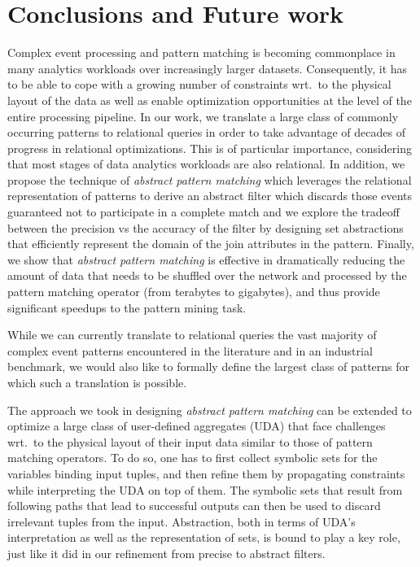 \section{Conclusions and Future work}
\label{sec:conclusions}

Complex event processing and pattern matching is becoming commonplace in many 
analytics workloads over increasingly larger datasets.
Consequently, it has to be able to cope with a growing number of constraints 
wrt.\ to the physical layout of the data as well as enable optimization 
opportunities at the level of the entire processing pipeline.
In our work, we translate a large class of commonly occurring patterns to 
relational queries in order to take advantage of decades of progress in 
relational optimizations.
This is of particular importance, considering that most stages of data 
analytics workloads are also relational. 
In addition, we propose the technique of {\em abstract pattern matching} which 
leverages the relational representation of patterns to derive an abstract 
filter which discards those events guaranteed not to participate in a complete 
match and we explore the tradeoff between the precision vs the accuracy of the 
filter by designing set abstractions that efficiently represent the domain of 
the join attributes in the pattern.
Finally, we show that {\em abstract pattern matching} is effective in 
dramatically reducing the amount of data that needs to be shuffled over the 
network and processed by the pattern matching operator (from terabytes to 
gigabytes), and thus provide significant speedups to the pattern mining task. 

While we can currently translate to relational queries the vast majority of 
complex event patterns encountered in the literature and in an industrial 
benchmark, we would also like to formally define the largest class of patterns 
for which such a translation is possible.

The approach we took in designing {\em abstract pattern matching} can be 
extended to optimize a large class of user-defined aggregates (UDA) that face  
challenges wrt.\ to the physical layout of their input data similar to those of 
pattern matching operators. 
To do so, one has to first collect symbolic sets for the variables binding 
input tuples, 
and then refine them by propagating constraints while     
interpreting the UDA on top of them.
The symbolic sets that result from following paths that lead to successful 
outputs can then be used to discard irrelevant tuples from the input.
Abstraction, both in terms of UDA's interpretation as well as the 
representation of sets, is bound to play a key role, just like it did in our 
refinement from precise to abstract filters.



